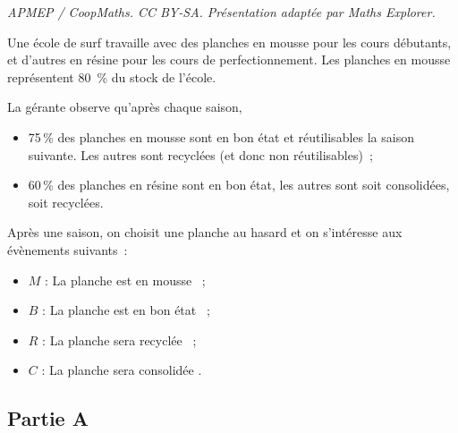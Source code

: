\documentclass[10pt]{article}
\begin{document}
\noindent\textit{APMEP / CoopMaths. CC BY-SA. Présentation adaptée par Maths Explorer.}\par\medskip
\medskip

Une école de surf travaille avec des planches en mousse pour les cours débutants, et d'autres en résine pour les cours de perfectionnement. Les planches en mousse représentent 80~\% du stock de l'école.

La gérante observe qu'après chaque saison,
\begin{itemize}[noitemsep]
\item 75\,\% des planches en mousse sont en bon état et réutilisables la saison suivante. Les autres sont recyclées (et donc non réutilisables)~;
\item 60\,\% des planches en résine sont en bon état, les autres sont soit consolidées, soit recyclées.
\end{itemize}

Après une saison, on choisit une planche au hasard et on s'intéresse aux évènements suivants~:
\begin{itemize}[noitemsep]
\item $M$ : \og La planche est en mousse \fg~;
\item $B$ : \og La planche est en bon état \fg~;
\item $R$ : \og La planche sera recyclée \fg~;
\item $C$ : \og La planche sera consolidée \fg.
\end{itemize}

\subsection*{Partie A}
\end{document}
